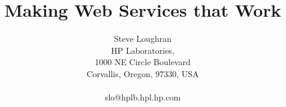 \documentclass[draft]{report}
\begin{document}

\setlength{\parskip}{3ex}

\parindent 0pt


\title{Making Web Services that Work}
\author{
    Steve Loughran\\
    HP Laboratories,\\
    1000 NE Circle Boulevard\\
    Corvallis, Oregon, 97330, USA\\
    \\
    slo@hplb.hpl.hp.com\\
    }
\maketitle
\end{document}
